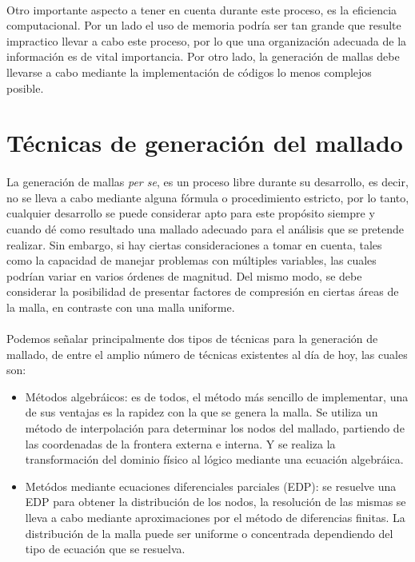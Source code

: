 \documentclass[letterpaper, openright, 12pt]{book}
\begin{document}
    \paragraph{}
        Otro importante aspecto a tener en cuenta durante este proceso, es la
        eficiencia computacional. Por un lado el uso de memoria podría ser tan
        grande que resulte impractico llevar a cabo este proceso, por lo que una
        organización adecuada de la información es de vital importancia. Por
        otro lado, la generación de mallas debe llevarse a cabo mediante la
        implementación de códigos lo menos complejos posible.

    \section{Técnicas de generación del mallado}
    \paragraph*{}
        La generación de mallas \textit{per se}, es un proceso libre durante su
        desarrollo, es decir, no se lleva a cabo mediante alguna fórmula o
        procedimiento estricto, por lo tanto, cualquier desarrollo se puede
        considerar apto para este propósito siempre y cuando dé como resultado
        una mallado adecuado para el análisis que se pretende realizar. Sin
        embargo, si hay ciertas consideraciones a tomar en cuenta, tales como la
        capacidad de manejar problemas con múltiples variables, las cuales
        podrían variar en varios órdenes de magnitud. Del mismo modo, se debe
        considerar la posibilidad de presentar factores de compresión en ciertas
        áreas de la malla, en contraste con una malla uniforme.

    \paragraph*{}
        Podemos señalar principalmente dos tipos de técnicas para la generación
        de mallado, de entre el amplio número de técnicas existentes al día de
        hoy, las cuales son:
        \begin{itemize}
            \item Métodos algebráicos: es de todos, el método más sencillo de
                implementar, una de sus ventajas es la rapidez con la que se
                genera la malla. Se utiliza un método de interpolación para
                determinar los nodos del mallado, partiendo de las coordenadas
                de la frontera externa e interna. Y se realiza la transformación
                del dominio físico al lógico mediante una ecuación algebráica.
            \item Metódos mediante  ecuaciones diferenciales parciales (EDP): se
                resuelve una EDP para obtener la distribución de los nodos,
                la resolución de las mismas se lleva a cabo mediante
                aproximaciones por el método de diferencias finitas. La
                distribución de la malla puede ser uniforme o concentrada
                dependiendo del tipo de ecuación que se resuelva.
        \end{itemize}
\end{document}
